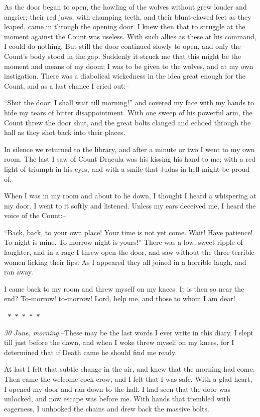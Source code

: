 \documentclass[12pt,openright]{book}
\begin{document}
As the door began to open, the howling of the wolves without grew louder and angrier; their red jaws, with champing teeth, and their blunt-clawed feet as they leaped, came in through the opening door. I knew then that to struggle at the moment against the Count was useless. With such allies as these at his command, I could do nothing. But still the door continued slowly to open, and only the Count’s body stood in the gap. Suddenly it struck me that this might be the moment and means of my doom; I was to be given to the wolves, and at my own instigation. There was a diabolical wickedness in the idea great enough for the Count, and as a last chance I cried out:–

“Shut the door; I shall wait till morning!” and covered my face with my hands to hide my tears of bitter disappointment. With one sweep of his powerful arm, the Count threw the door shut, and the great bolts clanged and echoed through the hall as they shot back into their places.

In silence we returned to the library, and after a minute or two I went to my own room. The last I saw of Count Dracula was his kissing his hand to me; with a red light of triumph in his eyes, and with a smile that Judas in hell might be proud of.

When I was in my room and about to lie down, I thought I heard a whispering at my door. I went to it softly and listened. Unless my ears deceived me, I heard the voice of the Count:–

“Back, back, to your own place! Your time is not yet come. Wait! Have patience! To-night is mine. To-morrow night is yours!” There was a low, sweet ripple of laughter, and in a rage I threw open the door, and saw without the three terrible women licking their lips. As I appeared they all joined in a horrible laugh, and ran away.

I came back to my room and threw myself on my knees. It is then so near the end? To-morrow! to-morrow! Lord, help me, and those to whom I am dear!

\texttt{   *       *       *       *       *}

\textit{30 June, morning.}–These may be the last words I ever write in this diary. I slept till just before the dawn, and when I woke threw myself on my knees, for I determined that if Death came he should find me ready.

At last I felt that subtle change in the air, and knew that the morning had come. Then came the welcome cock-crow, and I felt that I was safe. With a glad heart, I opened my door and ran down to the hall. I had seen that the door was unlocked, and now escape was before me. With hands that trembled with eagerness, I unhooked the chains and drew back the massive bolts.
\end{document}
